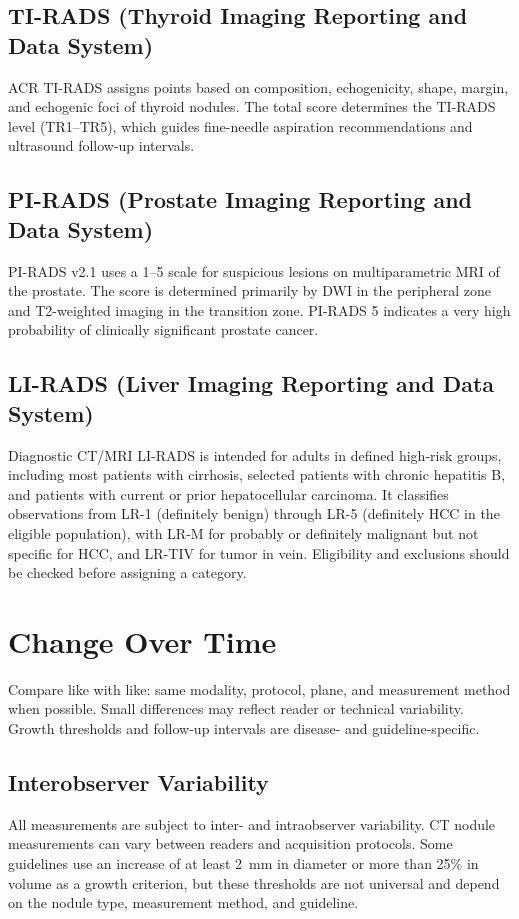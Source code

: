 \subsection{TI-RADS (Thyroid Imaging Reporting and Data System)}
ACR TI-RADS assigns points based on composition, echogenicity, shape, margin, and echogenic foci of thyroid nodules. The total score determines the TI-RADS level (TR1--TR5), which guides fine-needle aspiration recommendations and ultrasound follow-up intervals.

\subsection{PI-RADS (Prostate Imaging Reporting and Data System)}
PI-RADS v2.1 uses a 1--5 scale for suspicious lesions on multiparametric MRI of the prostate. The score is determined primarily by DWI in the peripheral zone and T2-weighted imaging in the transition zone. PI-RADS 5 indicates a very high probability of clinically significant prostate cancer.

\subsection{LI-RADS (Liver Imaging Reporting and Data System)}
Diagnostic CT/MRI LI-RADS is intended for adults in defined high-risk groups, including most patients with cirrhosis, selected patients with chronic hepatitis B, and patients with current or prior hepatocellular carcinoma. It classifies observations from LR-1 (definitely benign) through LR-5 (definitely HCC in the eligible population), with LR-M for probably or definitely malignant but not specific for HCC, and LR-TIV for tumor in vein. Eligibility and exclusions should be checked before assigning a category.

\section{Change Over Time}
Compare like with like: same modality, protocol, plane, and measurement method when possible. Small differences may reflect reader or technical variability. Growth thresholds and follow-up intervals are disease- and guideline-specific.

\subsection{Interobserver Variability}
All measurements are subject to inter- and intraobserver variability. CT nodule measurements can vary between readers and acquisition protocols. Some guidelines use an increase of at least 2~mm in diameter or more than 25\% in volume as a growth criterion, but these thresholds are not universal and depend on the nodule type, measurement method, and guideline.

